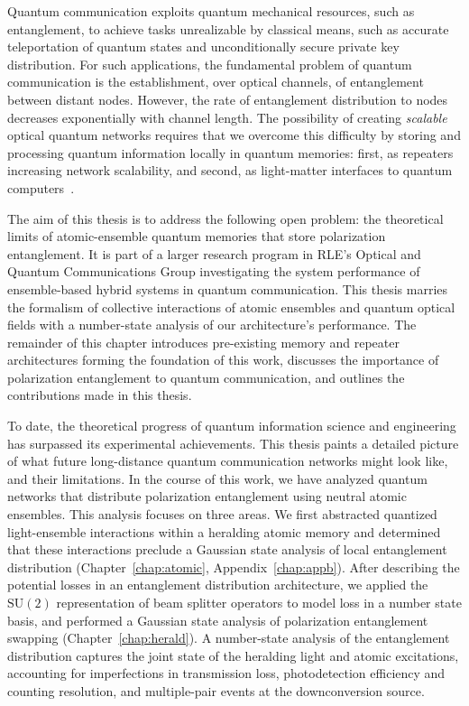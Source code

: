 \documentclass[aps,twocolumn,secnumarabic,amsmath,amssymb,pra,groupedaddress,
showpacs, showkeys]{revtex4-1}
\newcommand{\pna}[1]{\left(#1\right)}
\begin{document}
Quantum communication exploits quantum mechanical resources, such as
entanglement, to achieve tasks unrealizable by classical means, such as
accurate teleportation of quantum states and unconditionally secure private key
distribution. For such applications, the fundamental problem of quantum
communication is the establishment, over optical channels, of entanglement
between distant nodes. However, the rate of entanglement distribution to nodes
decreases exponentially with channel length. The possibility of creating
\emph{scalable} optical quantum networks requires that we overcome this
difficulty by storing and processing quantum information locally in quantum
memories: first, as repeaters increasing network scalability, and second, as
light-matter interfaces to quantum computers~\cite{nature07127}.

The aim of this thesis is to address the following open problem: the
theoretical limits of atomic-ensemble quantum memories that store polarization
entanglement. It is part of a larger research program in RLE's Optical and
Quantum Communications Group investigating the system performance of
ensemble-based hybrid systems in quantum communication. This thesis marries the
formalism of collective interactions of atomic ensembles and quantum optical
fields with a number-state analysis of our architecture's performance. The
remainder of this chapter introduces pre-existing memory and repeater
architectures forming the foundation of this work, discusses the importance of
polarization entanglement to quantum communication, and outlines the
contributions made in this thesis.

To date, the theoretical progress of quantum information science and
engineering has surpassed its experimental achievements. This thesis paints a
detailed picture of what future long-distance quantum communication networks
might look like, and their limitations. In the course of this work, we have
analyzed quantum networks that distribute polarization entanglement using
neutral atomic ensembles. This analysis focuses on three areas. We first
abstracted quantized light-ensemble interactions within a heralding atomic
memory and determined that these interactions preclude a Gaussian state
analysis of local entanglement distribution (Chapter~\ref{chap:atomic},
Appendix~\ref{chap:appb}). After describing the potential losses in an
entanglement distribution architecture, we applied the $\textrm{SU}\pna{2}$
representation of beam splitter operators to model loss in a number state
basis, and performed a Gaussian state analysis of polarization entanglement
swapping (Chapter~\ref{chap:herald}). A number-state analysis of the
entanglement distribution captures the joint state of the heralding light and
atomic excitations, accounting for imperfections in transmission loss,
photodetection efficiency and counting resolution, and multiple-pair events at
the downconversion source.
\end{document}
